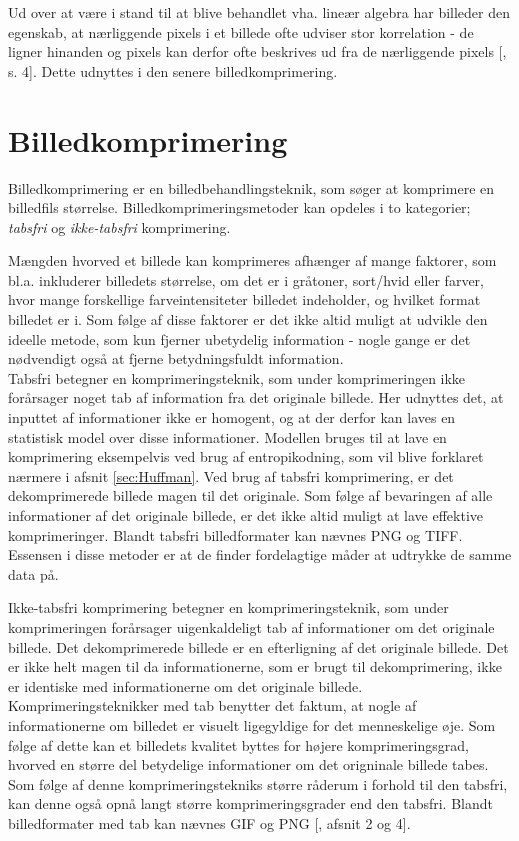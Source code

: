 Ud over at være i stand til at blive behandlet vha. lineær algebra har billeder den egenskab, at nærliggende pixels i et billede ofte udviser stor korrelation - de ligner hinanden og pixels kan derfor ofte beskrives ud fra de nærliggende pixels [\citet{lokminglui_DCT}, s. 4]. Dette udnyttes i den senere billedkomprimering.

\section{Billedkomprimering}
Billedkomprimering er en billedbehandlingsteknik, som søger at komprimere en billedfils størrelse. Billedkomprimeringsmetoder kan opdeles i to kategorier; \emph{tabsfri} og \emph{ikke-tabsfri} komprimering.

Mængden hvorved et billede kan komprimeres afhænger af mange faktorer, som bl.a. inkluderer billedets størrelse, om det er i gråtoner, sort/hvid eller farver, hvor mange forskellige farveintensiteter billedet indeholder, og hvilket format billedet er i. Som følge af disse faktorer er det ikke altid muligt at udvikle den ideelle metode, som kun fjerner ubetydelig information - nogle gange er det nødvendigt også at fjerne betydningsfuldt information.\\
Tabsfri betegner en komprimeringsteknik, som under komprimeringen ikke forårsager noget tab af information fra det originale billede. Her udnyttes det, at inputtet af informationer ikke er homogent, og at der derfor kan laves en statistisk model over disse informationer. Modellen bruges til at lave en komprimering eksempelvis ved brug af entropikodning, som vil blive forklaret nærmere i afsnit \vref{sec:Huffman}. Ved brug af tabsfri komprimering, er det dekomprimerede billede magen til det originale. Som følge af bevaringen af alle informationer af det originale billede, er det ikke altid muligt at lave effektive komprimeringer. Blandt tabsfri billedformater kan nævnes PNG og TIFF. Essensen i disse metoder er at de finder fordelagtige måder at udtrykke de samme data på.

Ikke-tabsfri komprimering betegner en komprimeringsteknik, som under komprimeringen forårsager uigenkaldeligt tab af informationer om det originale billede. Det dekomprimerede billede er en efterligning af det originale billede. Det er ikke helt magen til da informationerne, som er brugt til dekomprimering, ikke er identiske med informationerne om det originale billede. Komprimeringsteknikker med tab benytter det faktum, at nogle af informationerne om billedet er visuelt ligegyldige for det menneskelige øje. Som følge af dette kan et billedets kvalitet byttes for højere komprimeringsgrad, hvorved en større del betydelige informationer om det origninale billede tabes. Som følge af denne komprimeringstekniks større råderum i forhold til den tabsfri, kan denne også opnå langt større komprimeringsgrader end den tabsfri. Blandt billedformater med tab kan nævnes GIF og PNG [\citet{matthews}, afsnit 2 og 4].

